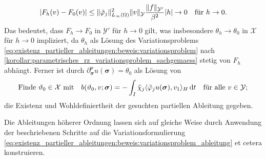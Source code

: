 \documentclass[../main.tex]{subfiles}
\begin{document}
\begin{Satz}
\begin{Beweis}
\begin{equation}
            \lvert F_{h}(v) - F_{0}(v)\rvert
            \leq \lVert\tilde{\varphi}_{j}\rVert^{2}_{L_{\infty}(\Omega)} \lVert v\rVert_{\mathcal Y} \frac{\lVert f\rVert_{\mathcal Y'}}{\beta^{2}} \lvert h\rvert \to 0 \quad \text{für}~h \to 0.
        \end{equation}
        Das bedeutet, dass $F_{h} \to F_{0}$ in $\mathcal Y'$ für $h \to 0$ gilt,
        was insbesondere $\theta_{h} \to \theta_{0}$ in $\mathcal X$ für $h \to 0$ impliziert, da $\theta_{h}$ als Lösung des Variationsproblems \cref{eq:existenz_partieller_ableitungen:beweis:variationsproblem} nach \cref{korollar:parametrisches_rz_variationsproblem_sachgemaess} stetig von $F_{h}$ abhängt.
        Ferner ist durch $\partial^{\bm\nu}_{\bm\sigma} u(\bm\sigma) = \theta_{0}$ als Lösung von
        \begin{equation}
            \label{eq:existenz_partieller_ableitungen:beweis:variationsproblem_ableitung}
            \text{Finde}~\theta_{0} \in \mathcal X \text{ mit} \quad b(\theta_{0}, v; \bm\sigma) = - \int_{I} \tilde{\chi}_{j} \skp{\tilde{\varphi}_{j}  u(\bm\sigma)}{v_{1}}{H} \diff t \quad \fa v \in \mathcal Y;
        \end{equation}
        die Existenz und Wohldefiniertheit der gesuchten partiellen Ableitung gegeben.

        Die Ableitungen höherer Ordnung lassen sich auf gleiche Weise durch Anwendung der beschriebenen Schritte auf die Variationsformulierung \cref{eq:existenz_partieller_ableitungen:beweis:variationsproblem_ableitung} et cetera konstruieren.
    \end{Beweis}
\end{Satz}
\end{document}

